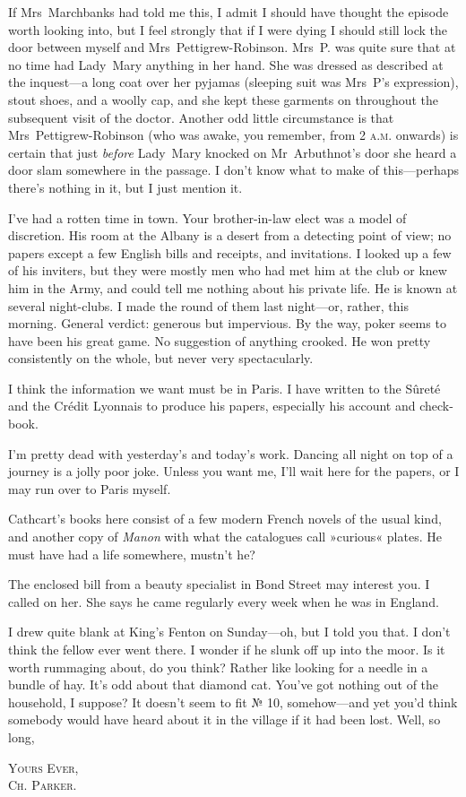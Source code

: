 If Mrs~Marchbanks had told me this, I admit I should have thought the episode worth looking into, but I feel strongly that if I were dying I should still lock the door between myself and Mrs~Pettigrew-Robinson.  Mrs~P. was quite sure that at no time had Lady~Mary anything in her hand. She was dressed as described at the inquest—a long coat over her pyjamas (sleeping suit was Mrs~P's expression), stout shoes, and a woolly cap, and she kept these garments on throughout the subsequent visit of the doctor. Another odd little circumstance is that Mrs~Pettigrew-Robinson (who was awake, you remember, from 2 \textsc{a.m.} onwards) is certain that just \textit{before} Lady~Mary knocked on Mr~Arbuthnot's door she heard a door slam somewhere in the passage. I don't know what to make of this—perhaps there's nothing in it, but I just mention it.

I've had a rotten time in town. Your brother-in-law elect was a model of discretion. His room at the Albany is a desert from a detecting point of view; no papers except a few English bills and receipts, and invitations. I looked up a few of his inviters, but they were mostly men who had met him at the club or knew him in the Army, and could tell me nothing about his private life. He is known at several night-clubs. I made the round of them last night—or, rather, this morning. General verdict: generous but impervious. By the way, poker seems to have been his great game. No suggestion of anything crooked.  He won pretty consistently on the whole, but never very spectacularly.

I think the information we want must be in Paris. I have written to the Sûreté and the Crédit Lyonnais to produce his papers, especially his account and check-book.

I'm pretty dead with yesterday's and today's work. Dancing all night on top of a journey is a jolly poor joke. Unless you want me, I'll wait here for the papers, or I may run over to Paris myself.

Cathcart's books here consist of a few modern French novels of the usual kind, and another copy of \textit{Manon} with what the catalogues call »curious« plates. He must have had a life somewhere, mustn't he?

The enclosed bill from a beauty specialist in Bond Street may interest you. I called on her. She says he came regularly every week when he was in England.

I drew quite blank at King's Fenton on Sunday—oh, but I told you that. I don't think the fellow ever went there. I wonder if he slunk off up into the moor. Is it worth rummaging about, do you think?  Rather like looking for a needle in a bundle of hay. It's odd about that diamond cat. You've got nothing out of the household, I suppose?  It doesn't seem to fit № 10, somehow—and yet you'd think somebody would have heard about it in the village if it had been lost. Well, so long,

\begin{flushright}
\textsc{Yours Ever,}\\
\textsc{Ch. Parker.}
\end{flushright}
